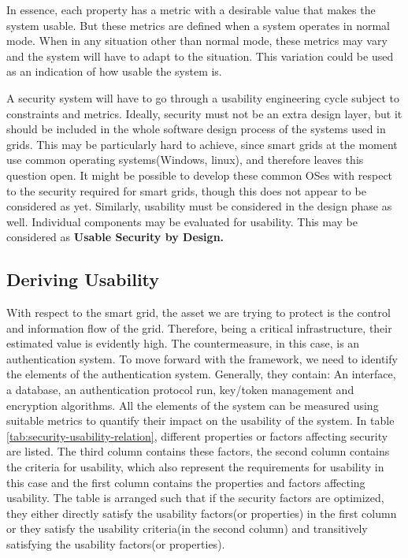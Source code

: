 In essence, each property has a metric with a desirable value that makes the system usable.
But these metrics are defined when a system operates in normal mode. When in any situation
other than normal mode, these metrics may vary and the system will have to adapt to the
situation. This variation could be used as an indication of how usable the system is.

A security system will have to go through a usability engineering cycle subject to constraints
and metrics. Ideally, security must not be an extra design layer, but it should be included in
the whole software design process of the systems used in grids. This may be particularly
hard to achieve, since smart grids at the moment use common operating systems(Windows,
linux), and therefore leaves this question open. It might be possible to develop these
common OSes with respect to the security required for smart grids, though this does not
appear to be considered as yet. Similarly, usability must be considered in the design phase as well. Individual components may be evaluated for usability. This may be considered as \textbf{Usable Security by Design.}


\subsection{Deriving Usability}
With respect to the smart grid, the asset we are trying to protect is the control and information flow of the grid. Therefore, being a critical infrastructure, their estimated value is evidently high.   
\newline The countermeasure, in this case, is an authentication system. To move forward with the framework, we need to identify the elements of the authentication system. Generally, they contain: An interface, a database, an authentication protocol run, key/token management and encryption algorithms. All the elements of the system can be measured using suitable metrics to quantify their impact on the usability of the system. In table \ref{tab:security-usability-relation}, different properties or factors affecting security are listed. The third column contains these factors, the second column contains the criteria for usability, which also represent the requirements for usability in this case and the first column contains the properties and factors affecting usability. The table is arranged such that if the security factors are optimized, they either directly satisfy the usability factors(or properties) in the first column or they satisfy the usability criteria(in the second column) and transitively satisfying the usability factors(or properties). 


